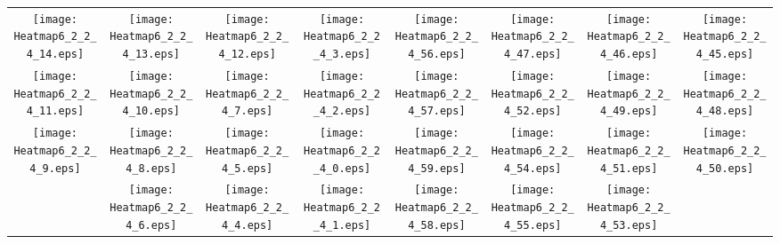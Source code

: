 \documentclass{standalone}
\begin{document}
\begin{tabular}{ *8{c} }
\texttt{[image: Heatmap6\_2\_2\_4\_14.eps]} & \texttt{[image: Heatmap6\_2\_2\_4\_13.eps]} & \texttt{[image: Heatmap6\_2\_2\_4\_12.eps]} & \texttt{[image: Heatmap6\_2\_2\_4\_3.eps]} & \texttt{[image: Heatmap6\_2\_2\_4\_56.eps]} & \texttt{[image: Heatmap6\_2\_2\_4\_47.eps]} & \texttt{[image: Heatmap6\_2\_2\_4\_46.eps]} & \texttt{[image: Heatmap6\_2\_2\_4\_45.eps]} \\
\texttt{[image: Heatmap6\_2\_2\_4\_11.eps]} & \texttt{[image: Heatmap6\_2\_2\_4\_10.eps]} & \texttt{[image: Heatmap6\_2\_2\_4\_7.eps]} & \texttt{[image: Heatmap6\_2\_2\_4\_2.eps]} & \texttt{[image: Heatmap6\_2\_2\_4\_57.eps]} & \texttt{[image: Heatmap6\_2\_2\_4\_52.eps]} & \texttt{[image: Heatmap6\_2\_2\_4\_49.eps]} & \texttt{[image: Heatmap6\_2\_2\_4\_48.eps]} \\
\texttt{[image: Heatmap6\_2\_2\_4\_9.eps]} & \texttt{[image: Heatmap6\_2\_2\_4\_8.eps]} & \texttt{[image: Heatmap6\_2\_2\_4\_5.eps]} & \texttt{[image: Heatmap6\_2\_2\_4\_0.eps]} & \texttt{[image: Heatmap6\_2\_2\_4\_59.eps]} & \texttt{[image: Heatmap6\_2\_2\_4\_54.eps]} & \texttt{[image: Heatmap6\_2\_2\_4\_51.eps]} & \texttt{[image: Heatmap6\_2\_2\_4\_50.eps]} \\
 & \texttt{[image: Heatmap6\_2\_2\_4\_6.eps]} & \texttt{[image: Heatmap6\_2\_2\_4\_4.eps]} & \texttt{[image: Heatmap6\_2\_2\_4\_1.eps]} & \texttt{[image: Heatmap6\_2\_2\_4\_58.eps]} & \texttt{[image: Heatmap6\_2\_2\_4\_55.eps]} & \texttt{[image: Heatmap6\_2\_2\_4\_53.eps]} &  
\end{tabular}
\end{document}
